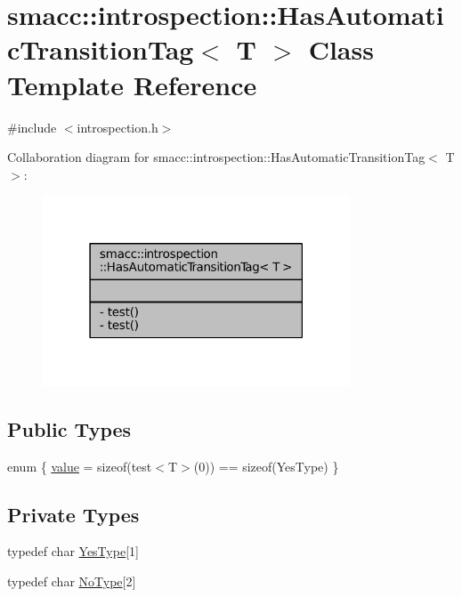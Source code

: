 \hypertarget{classsmacc_1_1introspection_1_1HasAutomaticTransitionTag}{}\section{smacc\+:\+:introspection\+:\+:Has\+Automatic\+Transition\+Tag$<$ T $>$ Class Template Reference}
\label{classsmacc_1_1introspection_1_1HasAutomaticTransitionTag}


{\ttfamily \#include $<$introspection.\+h$>$}



Collaboration diagram for smacc\+:\+:introspection\+:\+:Has\+Automatic\+Transition\+Tag$<$ T $>$\+:
\nopagebreak
\begin{figure}[H]
\begin{center}
\leavevmode
\includegraphics[width=259pt]{classsmacc_1_1introspection_1_1HasAutomaticTransitionTag__coll__graph}
\end{center}
\end{figure}
\subsection*{Public Types}
\begin{DoxyCompactItemize}
\item 
enum \{ \hyperlink{classsmacc_1_1introspection_1_1HasAutomaticTransitionTag_aa4d176f174bc660b4705a0ff3874d4aca4e813bb149aec14797ea59791542e845}{value} = sizeof(test$<$T$>$(0)) == sizeof(Yes\+Type)
 \}
\end{DoxyCompactItemize}
\subsection*{Private Types}
\begin{DoxyCompactItemize}
\item 
typedef char \hyperlink{classsmacc_1_1introspection_1_1HasAutomaticTransitionTag_a750a08a185de0fa20331ba7cfc531dde}{Yes\+Type}\mbox{[}1\mbox{]}
\item 
typedef char \hyperlink{classsmacc_1_1introspection_1_1HasAutomaticTransitionTag_ab81e7f76862ba064df3fd8e78b3864c4}{No\+Type}\mbox{[}2\mbox{]}
\end{DoxyCompactItemize}
